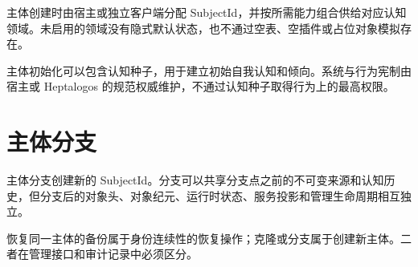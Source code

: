 主体创建时由宿主或独立客户端分配 SubjectId，并按所需能力组合供给对应认知领域。未启用的领域没有隐式默认状态，也不通过空表、空插件或占位对象模拟存在。

主体初始化可以包含认知种子，用于建立初始自我认知和倾向。系统与行为宪制由宿主或 Heptalogos 的规范权威维护，不通过认知种子取得行为上的最高权限。

\section{主体分支}

主体分支创建新的 SubjectId。分支可以共享分支点之前的不可变来源和认知历史，但分支后的对象头、对象纪元、运行时状态、服务投影和管理生命周期相互独立。

恢复同一主体的备份属于身份连续性的恢复操作；克隆或分支属于创建新主体。二者在管理接口和审计记录中必须区分。
